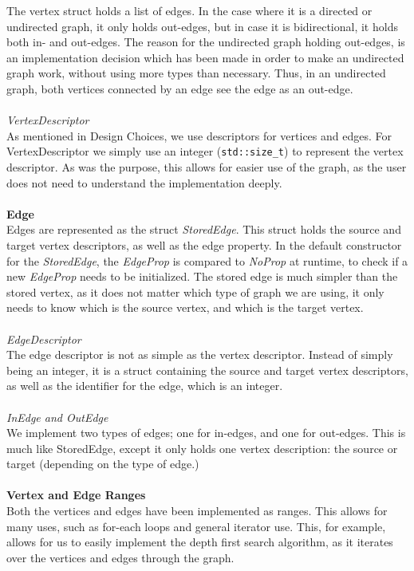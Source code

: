 \documentclass{article}
\begin{document}
The vertex struct holds a list of edges. In the case where it is a directed or undirected graph, it only holds out-edges, but in case it is bidirectional, it holds both in- and out-edges.
The reason for the undirected graph holding out-edges, is an implementation decision which has been made in order to make an undirected graph work, without using more types than necessary. 
Thus, in an undirected graph, both vertices connected by an edge see the edge as an out-edge.
\\\\
\textit{VertexDescriptor}\\
As mentioned in Design Choices, we use descriptors for vertices and edges. For VertexDescriptor we simply use an integer (\texttt{std::size\_t}) to represent the vertex descriptor. As was the purpose, this allows for easier use of the graph, as the user does not need to understand the implementation deeply.
\\\\
\noindent
\textbf{Edge}\\
Edges are represented as the struct \textit{StoredEdge}. This struct holds the source and target vertex descriptors, as well as the edge property. 
In the default constructor for the \textit{StoredEdge}, the \textit{EdgeProp} is compared to \textit{NoProp} at runtime, to check if a new \textit{EdgeProp} needs to be initialized.
The stored edge is much simpler than the stored vertex, as it does not matter which type of graph we are using, it only needs to know which is the source vertex, and which is the target vertex.
\\\\
\textit{EdgeDescriptor}\\
The edge descriptor is not as simple as the vertex descriptor. Instead of simply being an integer, it is a struct containing the source and target vertex descriptors, as well as the identifier for the edge, which is an integer.
\\\\
\textit{InEdge and OutEdge}\\
We implement two types of edges; one for in-edges, and one for out-edges. This is much like StoredEdge, except it only holds one vertex description: the source or target (depending on the type of edge.)
\\\\
\noindent
\textbf{Vertex and Edge Ranges}\\
Both the vertices and edges have been implemented as ranges. This allows for many uses, such as for-each loops and general iterator use. This, for example, allows for us to easily implement the depth first search algorithm, as it iterates over the vertices and edges through the graph.
\end{document}
